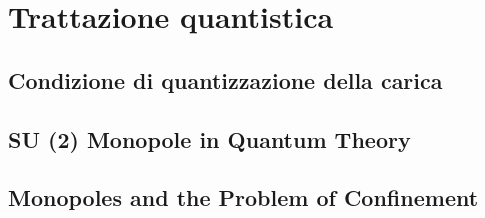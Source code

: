 
\chapter{Trattazione quantistica}
\section{Condizione di quantizzazione della carica}
\section{SU (2) Monopole in Quantum Theory}
\section{Monopoles and the Problem of Confinement}
